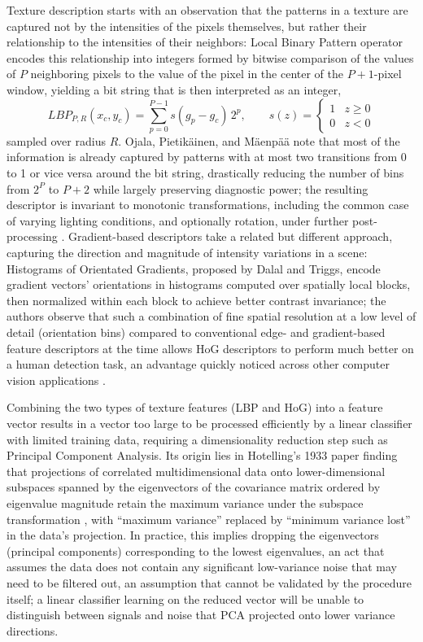Texture description starts with an observation that the patterns in a texture are captured not by the intensities of the pixels themselves, but rather their relationship to the intensities of their neighbors: Local Binary Pattern operator encodes this relationship into integers formed by bitwise comparison of the values of $P$ neighboring pixels to the value of the pixel in the center of the $P+1$-pixel window, yielding a bit string that is then interpreted as an integer,
\begin{equation}
LBP_{P,R}(x_c,y_c) = \sum_{p=0}^{P-1} s(g_p - g_c)\, 2^p, \qquad s(z) = \begin{cases} 1 & z \geq 0 \\ 0 & z < 0 \end{cases} \label{eq:lbp_general_definition}
\end{equation}
sampled over radius $R$. Ojala, Pietik\"{a}inen, and M\"{a}enp\"{a}\"{a} note that most of the information is already captured by patterns with at most two transitions from 0 to 1 or vice versa around the bit string, drastically reducing the number of bins from $2^P$ to $P+2$ while largely preserving diagnostic power; the resulting descriptor is invariant to monotonic transformations, including the common case of varying lighting conditions, and optionally rotation, under further post-processing \cite{ojala2002multiresolution}. Gradient-based descriptors take a related but different approach, capturing the direction and magnitude of intensity variations in a scene: Histograms of Orientated Gradients, proposed by Dalal and Triggs, encode gradient vectors' orientations in histograms computed over spatially local blocks, then normalized within each block to achieve better contrast invariance; the authors observe that such a combination of fine spatial resolution at a low level of detail (orientation bins) compared to conventional edge- and gradient-based feature descriptors at the time allows HoG descriptors to perform much better on a human detection task, an advantage quickly noticed across other computer vision applications \cite{dalal2005histograms}.

Combining the two types of texture features (LBP and HoG) into a feature vector results in a vector too large to be processed efficiently by a linear classifier with limited training data, requiring a dimensionality reduction step such as Principal Component Analysis. Its origin lies in Hotelling's 1933 paper finding that projections of correlated multidimensional data onto lower-dimensional subspaces spanned by the eigenvectors of the covariance matrix ordered by eigenvalue magnitude retain the maximum variance under the subspace transformation \cite{hotelling1933analysis}, with ``maximum variance'' replaced by ``minimum variance lost'' in the data's projection. In practice, this implies dropping the eigenvectors (principal components) corresponding to the lowest eigenvalues, an act that assumes the data does not contain any significant low-variance noise that may need to be filtered out, an assumption that cannot be validated by the procedure itself; a linear classifier learning on the reduced vector will be unable to distinguish between signals and noise that PCA projected onto lower variance directions.

